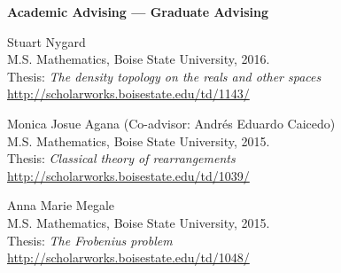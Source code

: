 \documentclass[12pt]{article}
\begin{document}
\textbf{Academic Advising --- Graduate Advising}
\begin{description}
\setlength{}
\item[]
Stuart Nygard \\
M.S. Mathematics, Boise State University, 2016. \\
Thesis: \emph{The density topology on the reals and other spaces} \\
\url{http://scholarworks.boisestate.edu/td/1143/}

\item[] Monica Josue Agana (Co-advisor: Andr\'es Eduardo Caicedo) \\
M.S. Mathematics, Boise State University, 2015. \\
Thesis: \emph{Classical theory of rearrangements} \\
\url{http://scholarworks.boisestate.edu/td/1039/}

\item[] Anna Marie Megale \\
M.S. Mathematics, Boise State University, 2015. \\
Thesis: \emph{The Frobenius problem} \\
\url{http://scholarworks.boisestate.edu/td/1048/}


\end{description}
\end{document}
